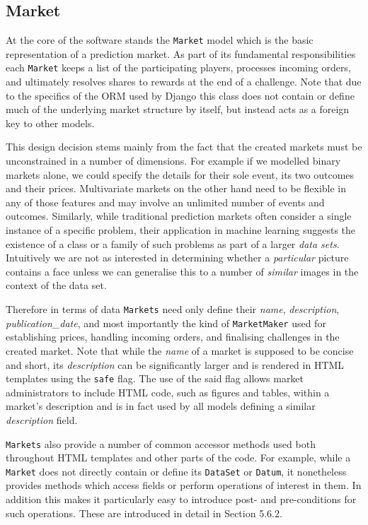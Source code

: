 \documentclass[bsc,frontabs,twoside,singlespacing,parskip,deptreport]{infthesis}     %
\begin{document}
\subsection{Market}
\label{sub:market}

    At the core of the software stands the {\tt Market} model which is the basic representation of a prediction market. As part of its fundamental responsibilities each {\tt Market} keeps a list of the participating players, processes incoming orders, and ultimately resolves shares to rewards at the end of a challenge. Note that due to the specifics of the ORM used by Django this class does not contain or define much of the underlying market structure by itself, but instead acts as a foreign key to other models. 

	This design decision stems mainly from the fact that the created markets must be unconstrained in a number of dimensions. For example if we modelled binary markets alone, we could specify the details for their sole event, its two outcomes and their prices. Multivariate markets on the other hand need to be flexible in any of those features and may involve an unlimited number of events and outcomes. Similarly, while traditional prediction markets often consider a single instance of a specific problem, their application in machine learning suggests the existence of a class or a family of such problems as part of a larger {\em data sets}. Intuitively we are not as interested in determining whether a {\em particular} picture contains a face unless we can generalise this to a number of {\em similar} images in the context of the data set. 

	Therefore in terms of data {\tt Markets} need only define their {\em name}, {\em description}, {\em publication\_date}, and most importantly the kind of {\tt MarketMaker} used for establishing prices, handling incoming orders, and finalising challenges in the created market. Note that while the {\it name} of a market is supposed to be concise and short, its {\it description} can be significantly larger and is rendered in HTML templates using the {\tt safe} flag. The use of the said flag allows market administrators to include HTML code, such as figures and tables, within a market's description and is in fact used by all models defining a similar {\it description} field. 

	{\tt Markets} also provide a number of common accessor methods used both throughout HTML templates and other parts of the code. For example, while a {\tt Market} does not directly contain or define its {\tt DataSet} or {\tt Datum}, it nonetheless provides methods which access fields or perform operations of interest in them. In addition this makes it particularly easy to introduce post- and pre-conditions for such operations. These are introduced in detail in Section 5.6.2. 
    
\end{document}
